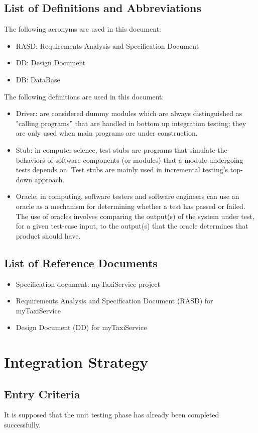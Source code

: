 \documentclass[a4paper,11pt]{report} %
\begin{document}
	\subsection{List of Definitions and Abbreviations}
		The following acronyms are used in this document:
		\begin{itemize}
			\item RASD: Requirements Analysis and Specification Document
			\item DD: Design Document
			\item DB: DataBase
		\end{itemize}
		The following definitions are used in this document:
			\begin{itemize}
				\item Driver: are considered dummy modules which are always distinguished as "calling programs” that are handled in bottom up integration testing; they are only used when main programs are under construction.
				\item Stub: in computer science, test stubs are programs that simulate the behaviors of software components (or modules) that a module undergoing tests depends on. Test stubs are mainly used in incremental testing's top-down approach.
				\item Oracle: in computing, software testers and software engineers can use an oracle as a mechanism for determining whether a test has passed or failed. The use of oracles involves comparing the output(s) of the system under test, for a given test-case input, to the output(s) that the oracle determines that product should have.
			\end{itemize}
	\subsection{List of Reference Documents}
		\begin{itemize}
			\item Specification document: myTaxiService project
			\item Requirements Analysis and Specification Document (RASD) for myTaxiService
			\item Design Document (DD) for myTaxiService
		\end{itemize}
	
	
	\section{Integration Strategy}
	\subsection{Entry Criteria}
		It is supposed that the unit testing phase has already been completed successfully.
\end{document}
